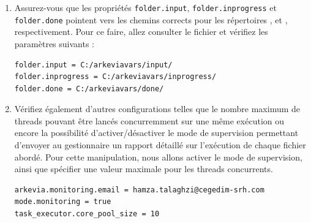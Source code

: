 \begin{enumerate}
\begin{figure}[H]
    \end{figure}
    \item Assurez-vous que les propriétés \lstinline|folder.input|, \lstinline|folder.inprogress| et \lstinline|folder.done| pointent vers les chemins corrects pour les répertoires ,  et , respectivement. Pour ce faire, allez consulter le fichier  et vérifiez les paramètres suivants :\\
\begin{lstlisting}[numbers=none]
folder.input = C:/arkeviavars/input/
folder.inprogress = C:/arkeviavars/inprogress/
folder.done = C:/arkeviavars/done/
\end{lstlisting}
\newpage
\item Vérifiez également d'autres configurations telles que le nombre maximum de threads pouvant être lancés concurremment sur une même exécution ou encore la possibilité d'activer/désactiver le mode de supervision permettant d'envoyer au gestionnaire un rapport détaillé sur l'exécution de chaque fichier abordé. Pour cette manipulation, nous allons activer le mode de supervision, ainsi que spécifier une valeur maximale pour les threads concurrents.\\
\begin{lstlisting}[numbers=none, deletekeywords={true}]
arkevia.monitoring.email = hamza.talaghzi@cegedim-srh.com
mode.monitoring = true
task_executor.core_pool_size = 10
\end{lstlisting}
\end{enumerate}
